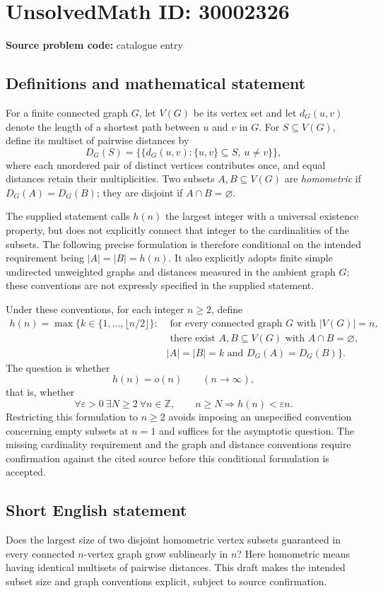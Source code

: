 \documentclass[11pt]{article}
\newcommand{\Z}{\mathbb{Z}}
\begin{document}
\section*{UnsolvedMath ID: 30002326}
\textbf{Source problem code:} catalogue entry
\subsection{Definitions and mathematical statement}
For a finite connected graph \(G\), let \(V(G)\) be its vertex set and let \(d_G(u,v)\) denote the length of a shortest path between \(u\) and \(v\) in \(G\). For \(S\subseteq V(G)\), define its multiset of pairwise distances by
\[
D_G(S)=\bigl\{\!\bigl\{d_G(u,v):\{u,v\}\subseteq S,\ u\ne v\bigr\}\!\bigr\},
\]
where each unordered pair of distinct vertices contributes once, and equal distances retain their multiplicities. Two subsets \(A,B\subseteq V(G)\) are \emph{homometric} if \(D_G(A)=D_G(B)\); they are disjoint if \(A\cap B=\varnothing\).

The supplied statement calls \(h(n)\) the largest integer with a universal existence property, but does not explicitly connect that integer to the cardinalities of the subsets. The following precise formulation is therefore conditional on the intended requirement being \(|A|=|B|=h(n)\). It also explicitly adopts finite simple undirected unweighted graphs and distances measured in the ambient graph \(G\); these conventions are not expressly specified in the supplied statement.

Under these conventions, for each integer \(n\ge 2\), define
\[
\begin{aligned}
h(n)=\max\bigl\{k\in\{1,\ldots,\lfloor n/2\rfloor\}:{}&\text{ for every connected graph }G\text{ with }|V(G)|=n,\\
&\text{ there exist }A,B\subseteq V(G)\text{ with }A\cap B=\varnothing,\\
&|A|=|B|=k\text{ and }D_G(A)=D_G(B)\bigr\}.
\end{aligned}
\]
The question is whether
\[
h(n)=o(n)\qquad(n\to\infty),
\]
that is, whether
\[
\forall\varepsilon>0\ \exists N\ge 2\ \forall n\in\Z,\qquad n\ge N\Longrightarrow h(n)<\varepsilon n.
\]
Restricting this formulation to \(n\ge2\) avoids imposing an unspecified convention concerning empty subsets at \(n=1\) and suffices for the asymptotic question. The missing cardinality requirement and the graph and distance conventions require confirmation against the cited source before this conditional formulation is accepted.
\subsection{Short English statement}
Does the largest size of two disjoint homometric vertex subsets guaranteed in every connected \(n\)-vertex graph grow sublinearly in \(n\)? Here homometric means having identical multisets of pairwise distances. This draft makes the intended subset size and graph conventions explicit, subject to source confirmation.
\end{document}
